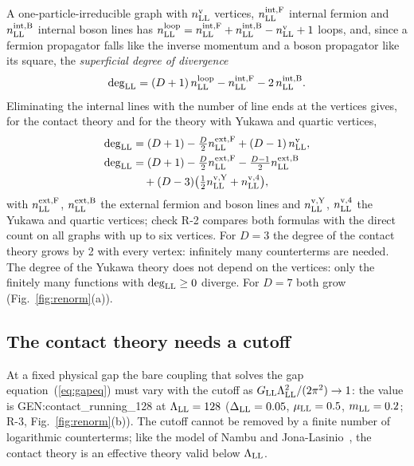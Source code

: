 A one-particle-irreducible graph with $n^{\rm v}_{\rm LL}$ vertices, $n^{\rm int,F}_{\rm LL}$ internal
fermion and $n^{\rm int,B}_{\rm LL}$ internal boson lines has $n^{\rm loop}_{\rm LL}=n^{\rm int,F}_{\rm
LL}+n^{\rm int,B}_{\rm LL}-n^{\rm v}_{\rm LL}+1$ loops, and, since a fermion propagator falls like the
inverse momentum and a boson propagator like its square, the \emph{superficial degree of divergence}
\begin{equation}
\deg_{\rm LL}=(D+1)\,n^{\rm loop}_{\rm LL}-n^{\rm int,F}_{\rm LL}-2\,n^{\rm int,B}_{\rm LL}.
\label{eq:deg}
\end{equation}
Eliminating the internal lines with the number of line ends at the vertices gives, for the contact theory
and for the theory with Yukawa and quartic vertices,
\begin{align}
\deg_{\rm LL}&=(D+1)-\tfrac D2n^{\rm ext,F}_{\rm LL}+(D-1)\,n^{\rm v}_{\rm LL},\label{eq:degc}\\
\deg_{\rm LL}&=(D+1)-\tfrac D2n^{\rm ext,F}_{\rm LL}-\tfrac{D-1}2n^{\rm ext,B}_{\rm LL}\nonumber\\
&\quad+(D-3)\big(\tfrac12n^{\rm v,Y}_{\rm LL}+n^{\rm v,4}_{\rm LL}\big),\label{eq:degy}
\end{align}
with $n^{\rm ext,F}_{\rm LL}$, $n^{\rm ext,B}_{\rm LL}$ the external fermion and boson lines and
$n^{\rm v,Y}_{\rm LL}$, $n^{\rm v,4}_{\rm LL}$ the Yukawa and quartic vertices; check R-2 compares both
formulas with the direct count on all graphs with up to six vertices. For $D=3$ the degree of the
contact theory grows by 2 with every vertex: infinitely many counterterms are needed. The degree of the
Yukawa theory does not depend on the vertices: only the finitely many functions with $\deg_{\rm
LL}\ge0$ diverge. For $D=7$ both grow (Fig.~\ref{fig:renorm}(a)).

\subsection{The contact theory needs a cutoff}

At a fixed physical gap the bare coupling that solves the gap equation~(\ref{eq:gapeq}) must vary with
the cutoff as $G_{\rm LL}\Lambda_{\rm LL}^2/(2\pi^2)\to1$: the value is {{GEN:contact_running_128}} at
$\Lambda_{\rm LL}=128$ ($\Delta_{\rm LL}=0.05$, $\mu_{\rm LL}=0.5$, $m_{\rm LL}=0.2$; R-3,
Fig.~\ref{fig:renorm}(b)). The cutoff cannot be removed by a finite number of logarithmic counterterms;
like the model of Nambu and Jona-Lasinio~\cite{NambuJonaLasinio1961}, the contact theory is an
effective theory valid below $\Lambda_{\rm LL}$.

